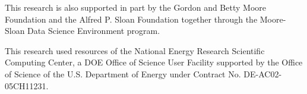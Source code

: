 \documentclass[10pt,journal,compsoc]{IEEEtran}
\begin{document}
This research is also supported in part by the Gordon and Betty Moore
Foundation and the Alfred P. Sloan Foundation together through the
Moore-Sloan Data Science Environment program.

This research used resources of the National Energy Research Scientific Computing Center, a DOE Office of Science User Facility supported by the Office of Science of the U.S. Department of Energy under Contract No. DE-AC02-05CH11231.

\ifCLASSOPTIONcaptionsoff
  \newpage
\fi







%



% 
\end{document}
